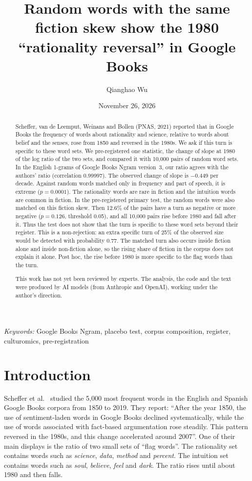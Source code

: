 \documentclass[11pt]{article}
\title{Random words with the same fiction skew show the 1980 ``rationality reversal'' in Google Books}
\author{Qianghao Wu}
\date{November 26, 2026}
\begin{document}
\maketitle

\begin{abstract}
Scheffer, van de Leemput, Weinans and Bollen (PNAS, 2021) reported that in Google Books the frequency of words about rationality and science, relative to words about belief and the senses, rose from 1850 and reversed in the 1980s. We ask if this turn is specific to these word sets. We pre-registered one statistic, the change of slope at 1980 of the log ratio of the two sets, and compared it with 10,000 pairs of random word sets. In the English 1-grams of Google Books Ngram version~3, our ratio agrees with the authors' ratio (correlation 0.99997). The observed change of slope is $-0.449$ per decade. Against random words matched only in frequency and part of speech, it is extreme ($p = 0.0001$). The rationality words are rare in fiction and the intuition words are common in fiction. In the pre-registered primary test, the random words were also matched on this fiction skew. Then 12.6\% of the pairs have a turn as negative or more negative ($p = 0.126$, threshold 0.05), and all 10,000 pairs rise before 1980 and fall after it. Thus the test does not show that the turn is specific to these word sets beyond their register. This is a non-rejection: an extra specific turn of 25\% of the observed size would be detected with probability 0.77. The matched turn also occurs inside fiction alone and inside non-fiction alone, so the rising share of fiction in the corpus does not explain it alone. Post hoc, the rise before 1980 is more specific to the flag words than the turn.

This work has not yet been reviewed by experts. The analysis, the code and the text were produced by AI models (from Anthropic and OpenAI), working under the author's direction.
\end{abstract}
\medskip
\noindent\textit{Keywords:} Google Books Ngram, placebo test, corpus composition, register, culturomics, pre-registration

\section{Introduction}
Scheffer et al.~\cite{scheffer} studied the 5,000 most frequent words in the English and Spanish Google Books corpora from 1850 to 2019. They report: ``After the year 1850, the use of sentiment-laden words in Google Books declined systematically, while the use of words associated with fact-based argumentation rose steadily. This pattern reversed in the 1980s, and this change accelerated around 2007''. One of their main displays is the ratio of two small sets of ``flag words''. The rationality set contains words such as \emph{science}, \emph{data}, \emph{method} and \emph{percent}. The intuition set contains words such as \emph{soul}, \emph{believe}, \emph{feel} and \emph{dark}. The ratio rises until about 1980 and then falls.
\end{document}

